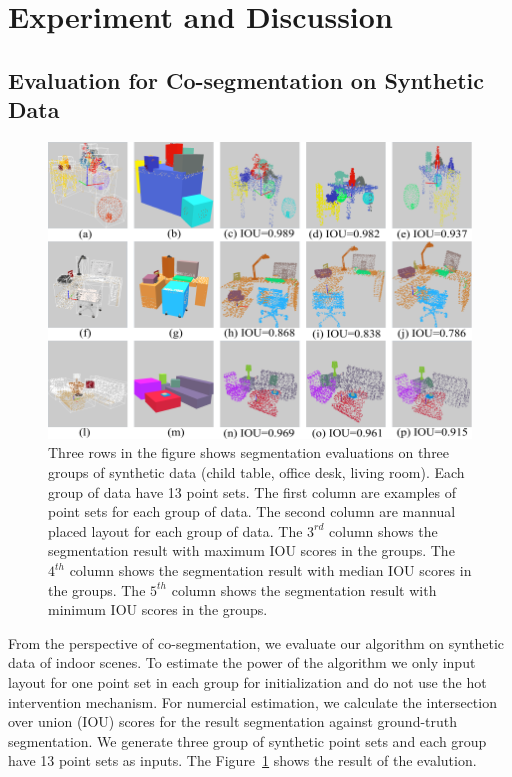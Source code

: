\section{Experiment and Discussion}
\subsection{Evaluation for Co-segmentation on Synthetic Data}
\begin{figure}[htb]
	\centering
	\includegraphics[width=\linewidth]{images/seg/seg}
	\caption{\label{fig:seg}Three rows in the figure shows segmentation evaluations on three groups of synthetic data (child table, office desk, living room). Each group of data have 13 point sets. The first column are examples of point sets for each group of data. The second column are mannual placed layout for each group of data. The $3^{rd}$ column shows the segmentation result with maximum IOU scores in the groups. The $4^{th}$ column shows the segmentation result with median IOU scores in the groups. The $5^{th}$ column shows the segmentation result with minimum IOU scores in the groups.}
\end{figure}
From the perspective of co-segmentation, we evaluate our algorithm on synthetic data of indoor scenes. To estimate the power of the algorithm we only input layout for one point set in each group for initialization and do not use the hot intervention mechanism. For numercial estimation, we calculate the intersection over union (IOU) scores for the result segmentation against ground-truth segmentation. We generate three group of synthetic point sets and each group have 13 point sets as inputs. The Figure~\ref{fig:seg} shows the result of the evalution.\\
